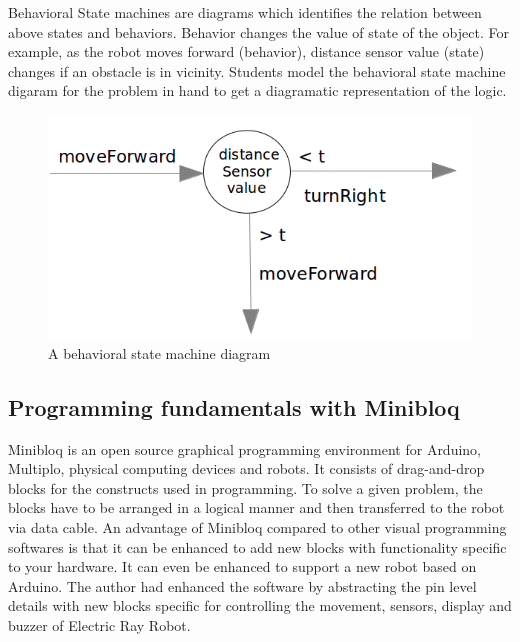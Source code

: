 \documentclass[conference]{IEEEtran}
\begin{document}
Behavioral State machines are diagrams which identifies the relation between above states and behaviors. Behavior changes the value of state of the object. For example, as the robot moves forward (behavior), distance sensor value (state) changes if an obstacle is in vicinity. Students model the behavioral state machine digaram for the problem in hand to get a diagramatic representation of the logic.

\begin{figure}[h]
\centering
\includegraphics[scale=0.2]{Fig_07.png}
\caption{A behavioral state machine diagram}
\end{figure}

\thispagestyle{fancy}

\subsection{Programming fundamentals with Minibloq}
Minibloq is an open source graphical programming environment for Arduino, Multiplo, physical computing devices and robots. It consists of drag-and-drop blocks for the constructs used in programming. To solve a given problem, the blocks have to be arranged in a logical manner and then transferred to the robot via data cable. An advantage of Minibloq compared to other visual programming softwares is that it can be enhanced to add new blocks with functionality specific to your hardware. It can even be enhanced to support a new robot based on Arduino. The author had enhanced the software by abstracting the pin level details with new blocks specific for controlling the movement, sensors, display and buzzer of Electric Ray Robot.
\end{document}
